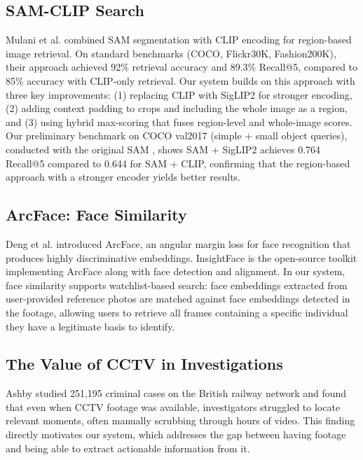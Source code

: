 \subsection{SAM-CLIP Search}

Mulani et al. \cite{mulani2025samclip} combined SAM segmentation with CLIP encoding for region-based image retrieval. On standard benchmarks (COCO, Flickr30K, Fashion200K), their approach achieved 92\% retrieval accuracy and 89.3\% Recall@5, compared to 85\% accuracy with CLIP-only retrieval. Our system builds on this approach with three key improvements: (1) replacing CLIP with SigLIP2 for stronger encoding, (2) adding context padding to crops and including the whole image as a region, and (3) using hybrid max-scoring that fuses region-level and whole-image scores. Our preliminary benchmark on COCO val2017 (simple + small object queries), conducted with the original SAM \cite{kirillov2023segment}, shows SAM + SigLIP2 achieves 0.764 Recall@5 compared to 0.644 for SAM + CLIP, confirming that the region-based approach with a stronger encoder yields better results.

\subsection{ArcFace: Face Similarity}

Deng et al. \cite{deng2019arcface} introduced ArcFace, an angular margin loss for face recognition that produces highly discriminative embeddings. InsightFace is the open-source toolkit implementing ArcFace along with face detection and alignment. In our system, face similarity supports watchlist-based search: face embeddings extracted from user-provided reference photos are matched against face embeddings detected in the footage, allowing users to retrieve all frames containing a specific individual they have a legitimate basis to identify.

\subsection{The Value of CCTV in Investigations}

Ashby \cite{ashby2017value} studied 251,195 criminal cases on the British railway network and found that even when CCTV footage was available, investigators struggled to locate relevant moments, often manually scrubbing through hours of video. This finding directly motivates our system, which addresses the gap between having footage and being able to extract actionable information from it.

